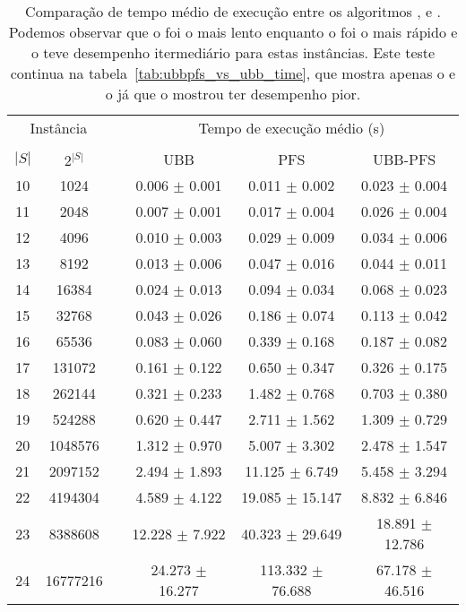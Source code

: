 \begin{table}
\centering
\footnotesize
\begin{tabular}{cc c ccc}
\toprule
\multicolumn{2}{c}{Instância} & \phantom{} & \multicolumn{3}{c}{Tempo de execução médio (s)}\\
\cline{1-2}\cline{4-6}\\
$|S|$ & $2^{|S|}$ && UBB & PFS & UBB-PFS  \\
10 &    1024 &&  0.006 $\pm$ 0.001 & 0.011 $\pm$ 0.002 & 0.023 $\pm$ 0.004 \\
11 &    2048 &&  0.007 $\pm$ 0.001 & 0.017 $\pm$ 0.004 & 0.026 $\pm$ 0.004 \\
12 &    4096 &&  0.010 $\pm$ 0.003 & 0.029 $\pm$ 0.009 & 0.034 $\pm$ 0.006 \\
13 &    8192 &&  0.013 $\pm$ 0.006 & 0.047 $\pm$ 0.016 & 0.044 $\pm$ 0.011 \\
14 &   16384 &&  0.024 $\pm$ 0.013 & 0.094 $\pm$ 0.034 & 0.068 $\pm$ 0.023 \\
15 &   32768 &&  0.043 $\pm$ 0.026 & 0.186 $\pm$ 0.074 & 0.113 $\pm$ 0.042 \\
16 &   65536 &&  0.083 $\pm$ 0.060 & 0.339 $\pm$ 0.168 & 0.187 $\pm$ 0.082 \\
17 &  131072 &&  0.161 $\pm$ 0.122 & 0.650 $\pm$ 0.347 & 0.326 $\pm$ 0.175 \\
18 &  262144 &&  0.321 $\pm$ 0.233 & 1.482 $\pm$ 0.768 & 0.703 $\pm$ 0.380 \\
19 &  524288 &&  0.620 $\pm$ 0.447 & 2.711 $\pm$ 1.562 & 1.309 $\pm$ 0.729 \\
20 & 1048576 &&  1.312 $\pm$ 0.970 & 5.007 $\pm$ 3.302 & 2.478 $\pm$ 1.547 \\
21 & 2097152 &&  2.494 $\pm$ 1.893 & 11.125 $\pm$ 6.749 & 5.458 $\pm$ 3.294 \\
22 & 4194304 &&  4.589 $\pm$ 4.122 & 19.085 $\pm$ 15.147 & 8.832 $\pm$ 6.846 \\
23 & 8388608 &&  12.228 $\pm$ 7.922 & 40.323 $\pm$ 29.649 & 18.891 $\pm$ 12.786 \\
24 & 16777216 &&  24.273 $\pm$ 16.277 & 113.332 $\pm$ 76.688 & 67.178 $\pm$ 46.516 \\
\bottomrule
\end{tabular}
\caption{Comparação de tempo médio de execução entre os algoritmos
,  e . Podemos observar que
o  foi o mais lento enquanto o  foi o mais
rápido e o  teve desempenho itermediário para estas
instâncias. Este teste continua na tabela~\ref{tab:ubbpfs_vs_ubb_time},
que mostra apenas o  e o  já que o 
 mostrou ter desempenho pior.}
\label{tab:ubbpfs_vs_ubb_vs_pfs_time}
\end{table}

